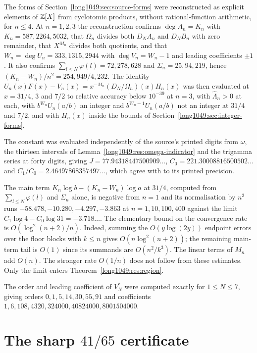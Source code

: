 \documentclass[11pt]{article}
\begin{document}
The forms of Section~\ref{long1049:sec:source-forms} were reconstructed as explicit
elements of $\mathbb{Z}[X]$ from cyclotomic products, without rational-function
arithmetic, for $n\le4$.  At $n=1,2,3$ the reconstruction confirms
$\deg A_n=K_n$ with $K_n=587,2264,5032$, that $\Omega_n$ divides both $D_NA_n$
and $D_NB_n$ with zero remainder, that $X^{M_n}$ divides both quotients, and
that $W_n=\deg U_n=333,1315,2944$ with $\deg V_n=W_n-1$ and leading
coefficients $\pm1$.  It also confirms
$\sum_{l\le N}\varphi(l)=72,278,628$ and $\Sigma_n=25,94,219$, hence
$(K_n-W_n)/n^{2}=254,949/4,232$.  The identity
$U_n(x)F(x)-V_n(x)=x^{-M_n}(D_N/\Omega_n)(x)H_n(x)$ was then evaluated at
$x=31/4$, $3$ and $7/2$ to relative accuracy below $10^{-39}$ at $n=3$, with
$\widehat\Lambda_n>0$ at each, with $b^{W_n}U_n(a/b)$ an integer and
$b^{W_n-1}U_n(a/b)$ not an integer at $31/4$ and $7/2$, and with $H_n(x)$
inside the bounds of Section~\ref{long1049:sec:integer-forms}.

The constant was evaluated independently of the source's printed digits from
$\omega$, the thirteen intervals of Lemma~\ref{long1049:res:omega-indicator} and the
trigamma series at forty digits, giving
$J=77.94318447500909\ldots$, $C_0=221.30008816500502\ldots$ and
$C_1/C_0=2.46497868357497\ldots$, which agree with
\cite[p.~162]{zudilin2004} to its printed precision.

The main term $K_n\log b-(K_n-W_n)\log a$ at $31/4$, computed from
$\sum_{l\le N}\varphi(l)$ and $\Sigma_n$ alone, is negative from $n=1$ and its
normalisation by $n^{2}$ runs $-58.478,-10.280,-4.297,-3.863$ at
$n=1,10,100,400$ against the limit $C_1\log4-C_0\log31=-3.718\ldots$.  The
elementary bound on the convergence rate is $O(\log^2(n+2)/n)$.
Indeed, summing the $O(y\log(2y))$ endpoint errors over the floor blocks
with $k\le n$ gives $O(n\log^2(n+2))$; the remaining main-term tail is
$O(1)$ since its summands are $O(n^2/k^3)$.  The linear terms of $M_n$
add $O(n)$.  The stronger rate $O(1/n)$ does not follow from these estimates.  Only the limit enters Theorem~\ref{long1049:res:region}.

The order and leading coefficient of $V_N^{*}$ were computed exactly for
$1\le N\le7$, giving orders $0,1,5,14,30,55,91$ and coefficients
$1,6,108,4320,324000,40824000,8001504000$.

\section{The sharp $41/65$ certificate}\label{long1049:sec:sharp}
\end{document}
